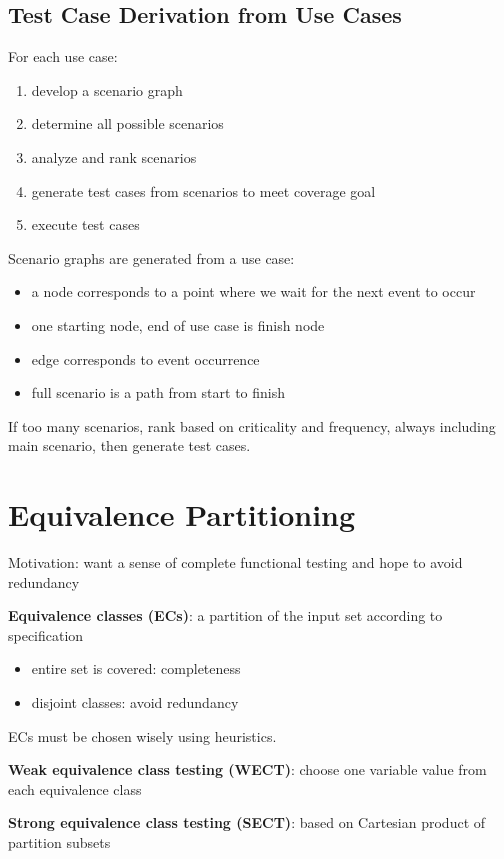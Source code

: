 \documentclass[11pt]{article}
\begin{document}
\subsection{Test Case Derivation from Use Cases}
\label{sec:orge893991}
For each use case:
\begin{enumerate}
\item develop a scenario graph
\item determine all possible scenarios
\item analyze and rank scenarios
\item generate test cases from scenarios to meet coverage goal
\item execute test cases
\end{enumerate}

Scenario graphs are generated from a use case:
\begin{itemize}
\item a node corresponds to a point where we wait for the next event to occur
\item one starting node, end of use case is finish node
\item edge corresponds to event occurrence
\item full scenario is a path from start to finish
\end{itemize}

If too many scenarios, rank based on criticality and frequency, always
including main scenario, then generate test cases.
\section{Equivalence Partitioning}
\label{sec:orgec99514}
Motivation: want a sense of complete functional testing and hope to avoid
redundancy

\textbf{Equivalence classes (ECs)}: a partition of the input set according to
specification
\begin{itemize}
\item entire set is covered: completeness
\item disjoint classes: avoid redundancy
\end{itemize}

ECs must be chosen wisely using heuristics.

\textbf{Weak equivalence class testing (WECT)}:
choose one variable value from each equivalence class

\textbf{Strong equivalence class testing (SECT)}:
based on Cartesian product of partition subsets
\end{document}
